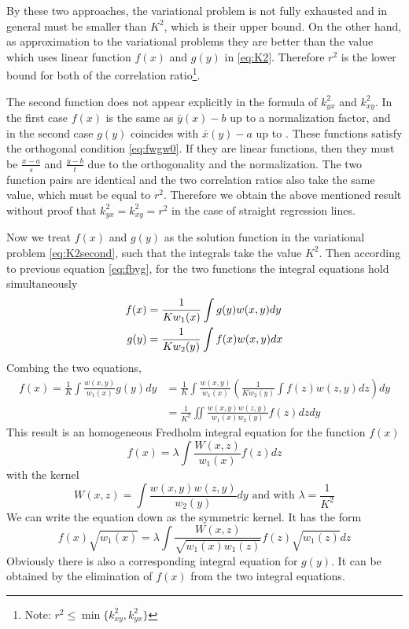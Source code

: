 \documentclass{article}
\begin{document}
By these two approaches, the variational problem is not fully exhausted and in general must be smaller than $K^2$, which
is their upper bound.
On the other hand, as approximation to the variational
problems they are better than the value which uses linear
function $f(x)$ and $g(y)$ in \eqref{eq:K2}.
Therefore $r^2$ is the lower bound for both of
the correlation ratio\footnote{Note: $r^2 \leq \min\{k^2_{xy}, k^2_{yx}\}$}.

The second function does not appear explicitly
in the formula of $k^2_{yx}$
and $k^2_{xy}$. In the first case $f(x)$ is the same as
$\bar{y}(x)-b$ up to a normalization factor, and in the
second case $g(y)$ coincides with $\bar{x}(y)-a$ up to .
These functions satisfy the orthogonal condition
\eqref{eq:fwgw0}. If they are linear functions,
then they must be $\frac{x-a}{s}$
and $\frac{y-b}{t}$ due to the orthogonality and the normalization. The two function pairs are identical and
the two correlation ratios also take the same value,
which must be equal to $r^2$. Therefore we obtain the above
mentioned result without proof that $k^2_{yx}
= k^2_{xy}=r^2$ in the case of straight regression lines.

Now we treat $f(x)$ and $g(y)$ as the solution function
in the variational problem \eqref{eq:K2second}, such that
the integrals take the value $K^2$. Then according to
previous equation \eqref{eq:fbyg}, for the two functions
the integral equations hold simultaneously
\begin{align}
    f(x) &= \frac{1}{K w_1(x)}\int g(y)w(x,y)dy \notag \\
    g(y) &= \frac{1}{K w_2(y)}\int f(x) w(x,y)dx \label{eq:gbyf}
\end{align}
Combing the two equations,
\begin{align*}
    f(x) = \frac{1}{K}
    \int \frac{w(x,y)}{w_1(x)} g(y)dy
    & = \frac{1}{K}
    \int \frac{w(x,y)}{w_1(x)}  (\frac{1}{K w_2(y)}\int f(z) w(z,y)dz )dy \\
    &= \frac{1}{K^2}
    \iint \frac{w(x,y)w(z,y)}{w_1(x)w_2(y)}f(z)dzdy
\end{align*}
This result is an homogeneous Fredholm integral
equation for the function $f(x)$
\begin{equation}
    f(x) = \lambda \int \frac{W(x,z)}{w_1(x)}f(z) dz
\end{equation}
with the kernel
$$
W(x,z) = \int \frac{w(x,y)w(z,y)}{w_2(y)} dy
\textrm{ and with } \lambda = \frac{1}{K^2}
$$
We can write the equation down as the symmetric kernel.
It has the form
\begin{equation}\label{eq:18a}
    f(x)\sqrt{w_1(x)}
    =\lambda \int \frac{W(x,z)}{\sqrt{w_1(x) w_1(z)}}
    f(z) \sqrt{w_1(z)}dz
    \tag{18a}
\end{equation}
Obviously there is also a corresponding integral equation
for $g(y)$.
It can be obtained by the elimination of $f(x)$ 
from the two integral equations.
\end{document}
